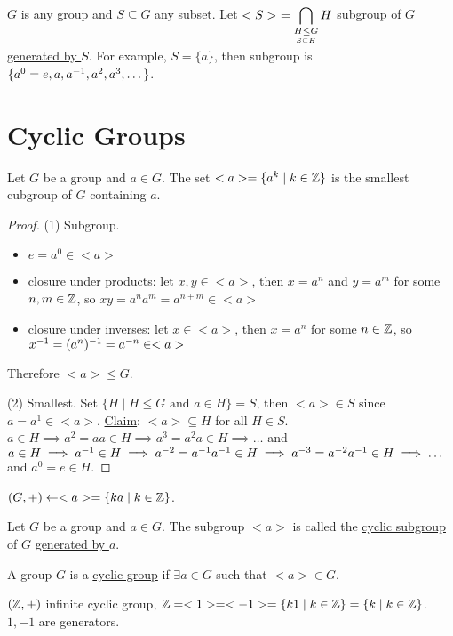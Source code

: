 \documentclass[]{article}
\begin{document}
\begin{example}
	$G$ is any group and $S\subseteq G$ any subset.
	Let $\displaystyle < S >\ = \bigcap_{\underset{S\subseteq H}{H\leq G}} H$ subgroup of $G$ \ul{generated by $S$}. For example, $S = \{a\}$, then subgroup is $\{a^0=e,a,a^{-1},a^2,a^3,\dots\}$.
\end{example}

\section{Cyclic Groups}

\begin{theorem}
	Let $G$ be a group and $a\in G$. The set $<a> = \{a^k \mid k\in \mathbb{Z}\}$ is the smallest cubgroup of $G$ containing $a$.
\end{theorem}
\begin{proof}
	(1) Subgroup.
	\begin{itemize}
		\item $e = a^0 \in <a>$
		\item closure under products: let $x,y\in <a>$, then $x = a^n$ and $y=a^m$ for some $n,m\in\mathbb{Z}$, so $xy = a^na^m = a^{n+m}\in <a>$
		\item closure under inverses: let $x\in <a>$, then $x=a^n$ for some $n\in\mathbb{Z}$, so $x^{-1} = (a^n)^{-1} = a^{-n}\in <a>$
	\end{itemize}
	Therefore $<a>\leq G$.

	(2) Smallest.
	Set $\{H\mid H\leq G \text{ and } a\in H\} = S$, then $<a> \in S$ since $a = a^1 \in <a>$. \ul{Claim}: $<a>\subseteq H$ for all $H\in S$.
	$a\in H \implies a^2 = aa\in H \implies a^3 = a^2a\in H \implies \dots$ and $a\in H\implies a^{-1}\in H \implies a^{-2} = a^{-1} a^{-1} \in H \implies a^{-3} = a^{-2}a^{-1} \in H \implies \dots$ and $a^0 = e\in H$.
\end{proof}
\begin{note}
	$(G,+) \leftarrow <a> = \{ka \mid k\in\mathbb{Z}\}$.
\end{note}
\begin{definition}
	Let $G$ be a group and $a\in G$. The subgroup $<a>$ is called the \ul{cyclic subgroup} of $G$ \ul{generated by $a$}.
\end{definition}
\begin{definition}
	A group $G$ is a \ul{cyclic group} if $\exists a\in G$ such that $<a>\in G$.
\end{definition}
\begin{example}
	$(\mathbb{Z},+)$ infinite cyclic group, $\mathbb{Z} = <1> = <-1> = \{k1\mid k\in\mathbb{Z}\} = \{k\mid k\in\mathbb{Z}\}$. $1,-1$ are generators.
\end{example}
\end{document}
